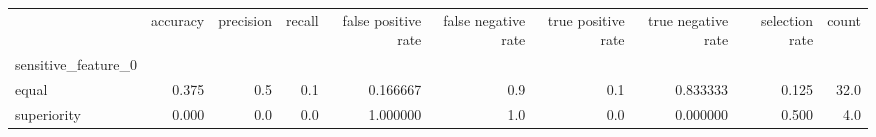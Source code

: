 \begin{tabular}{lrrrrrrrrr}
\toprule
{} &  accuracy &  precision &  recall &  false positive rate &  false negative rate &  true positive rate &  true negative rate &  selection rate &  count \\
sensitive\_feature\_0 &           &            &         &                      &                      &                     &                     &                 &        \\
\midrule
equal               &     0.375 &        0.5 &     0.1 &             0.166667 &                  0.9 &                 0.1 &            0.833333 &           0.125 &   32.0 \\
superiority         &     0.000 &        0.0 &     0.0 &             1.000000 &                  1.0 &                 0.0 &            0.000000 &           0.500 &    4.0 \\
\bottomrule
\end{tabular}
